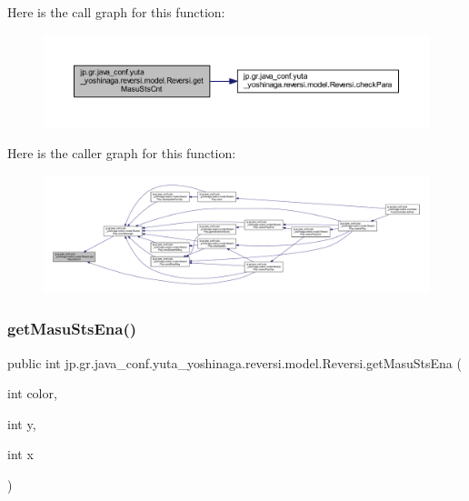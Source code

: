 Here is the call graph for this function\+:
\nopagebreak
\begin{figure}[H]
\begin{center}
\leavevmode
\includegraphics[width=350pt]{classjp_1_1gr_1_1java__conf_1_1yuta__yoshinaga_1_1reversi_1_1model_1_1_reversi_a1a528710342faba65975f4768d24b129_cgraph}
\end{center}
\end{figure}
Here is the caller graph for this function\+:
\nopagebreak
\begin{figure}[H]
\begin{center}
\leavevmode
\includegraphics[width=350pt]{classjp_1_1gr_1_1java__conf_1_1yuta__yoshinaga_1_1reversi_1_1model_1_1_reversi_a1a528710342faba65975f4768d24b129_icgraph}
\end{center}
\end{figure}
\mbox{\label{classjp_1_1gr_1_1java__conf_1_1yuta__yoshinaga_1_1reversi_1_1model_1_1_reversi_a055f20327e781b1f6807dba0baa1e51b}} 
\subsubsection{\texorpdfstring{get\+Masu\+Sts\+Ena()}{getMasuStsEna()}}
{\footnotesize\ttfamily public int jp.\+gr.\+java\+\_\+conf.\+yuta\+\_\+yoshinaga.\+reversi.\+model.\+Reversi.\+get\+Masu\+Sts\+Ena (\begin{DoxyParamCaption}\item[{int}]{color,  }\item[{int}]{y,  }\item[{int}]{x }\end{DoxyParamCaption})}




